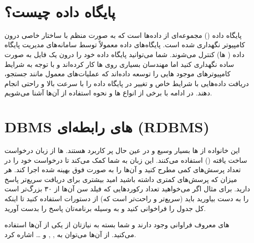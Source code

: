 \documentclass[]{article}
\begin{document}
\newpage
\pagestyle{fancy}
\fancyhf{}
\fancyfoot{}
\cfoot{\thepage}
\renewcommand{\headrulewidth}{2pt}

\KashidaOff


 \Large \textbf{\\
}


\section*{{\titr پایگاه داده چیست؟}}

پایگاه داده () مجموعه‌ای از داده‌ها است که به صورت منظم با ساختار خاصی درون کامپیوتر نگهداری شده است. پایگاه‌های داده معمولاً توسط سامانه‌های مدیریت پایگاه داده ( ها) کنترل می‌شوند. شما می‌توانید پایگاه داده خود را درون یک فایل به صورت ساده نگهداری کنید اما مهندسان بسیاری روی  ها کار کرده‌اند و با توجه به شرایط کامپیوتر‌های موجود  هایی را توسعه داده‌اند که عملیات‌های معمول مانند جستجو، دریافت داده‌هایی با شرایط خاص و تغییر در پایگاه داده را با سرعت بالا و راحتی انجام دهند. در ادامه با برخی از انواع  ها و نحوه استفاده از آن‌ها آشنا می‌شویم.



\section*{{\titr DBMS های رابطه‌ای (RDBMS)}}


این خانواده از  ها بسیار وسیع و در عین حال پر کاربرد هستند.  ها از زبان درخواست ساخت یافته () استفاده می‌کنند. این زبان به شما کمک می‌کند تا درخواست خود را در تعداد پرسش‌های کمی مطرح کنید و  آن‌ها را به صورت فوق بهینه شده اجرا کند. هر میزان که پرسش‌های کمتری داشته باشید امید بیشتری برای دریافت سریع‌تر پاسخ دارید. برای مثال اگر می‌خواهید تعداد رکورد‌هایی که فیلد سن آن‌ها از ۳۰ بزرگ‌تر است را به دست بیاورید باید (سریع‌تر و راحت‌تر است که) از دستورات  استفاده کنید تا اینکه کل جدول را فراخوانی کنید و به وسیله برنامه‌تان پاسخ را بدست آورید.

 های معروف فراوانی وجود دارند و شما بسته به نیازتان از یکی از آن‌ها استفاده می‌کنید. از آن‌ها می‌توان به , ,  و … اشاره کرد.
\end{document}
